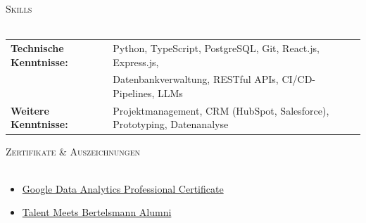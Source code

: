 \documentclass[a4paper]{article}
\newcommand{\lineunder} {
    \vspace*{-8pt} \\
    \hspace*{-18pt} \hrulefill \\
}
\newcommand{\header} [1] {
    {\hspace*{-18pt}\vspace*{6pt} \textsc{#1}}
    \vspace*{-6pt} \lineunder
}
\begin{document}
\vspace{-1mm}

\header{Skills}
\vspace{1mm}
\begin{tabular}{ l l }
	\textbf{Technische Kenntnisse:} & Python, TypeScript, PostgreSQL, Git, React.js, Express.js, \\ 
    \textbf{} & Datenbankverwaltung, RESTful APIs, CI/CD-Pipelines, LLMs \\
    \textbf{Weitere Kenntnisse:} & Projektmanagement, CRM (HubSpot, Salesforce), Prototyping, Datenanalyse\\
\end{tabular}
\vspace{1mm}

\header{Zertifikate \& Auszeichnungen}
\vspace{-2mm}
\begin{itemize} \itemsep -2pt
	\item \href{https://coursera.org/share/77f44f712619905a07ce551f806c10e4}{Google Data Analytics Professional Certificate}
	\item \href{https://createyourowncareer.de/studenten/talent-meets-bertelsmann}{Talent Meets Bertelsmann Alumni}
\end{itemize}
\vspace{2mm}

\
\end{document}
